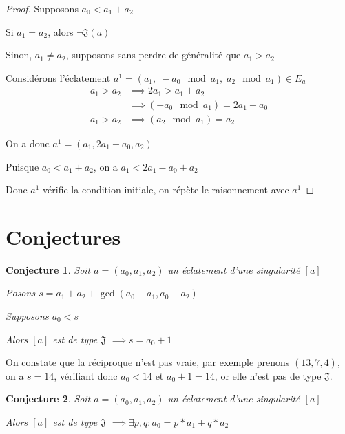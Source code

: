 \documentclass{article}
\newtheorem{conjecture}{Conjecture}
\begin{document}
\begin{proof}
    Supposons $a_0 < a_1 + a_2$

    Si $a_1 = a_2$, alors $\neg \mathfrak{J}(a)$

    Sinon, $a_1 \neq a_2$, supposons sans perdre de généralité que $a_1 > a_2$

    Considérons l'éclatement $a^1 = (a_1,\; -a_0 \mod a_1,\; a_2 \mod a_1) \in E_a$
    \begin{align*}
        a_1 > a_2 & \implies 2a_1 > a_1+a_2               \\
                  & \implies (-a_0 \mod a_1) = 2a_1 - a_0 \\
        a_1 > a_2 & \implies (a_2 \mod a_1) = a_2
    \end{align*}

    On a donc $a^1 = (a_1, 2a_1-a_0, a_2)$

    Puisque $a_0 < a_1 + a_2$, on a $a_1 < 2a_1 - a_0 + a_2$

    Donc $a^1$ vérifie la condition initiale, on répète le raisonnement avec $a^1$
\end{proof}

\section{Conjectures}

\begin{conjecture}
    Soit $a=(a_0, a_1, a_2)$ un éclatement d'une singularité $[a]$

    Posons $s = a_1 + a_2 + \gcd(a_0-a_1, a_0-a_2)$

    Supposons $a_0 < s$

    Alors $[a]$ est de type $\mathfrak{J}$ $\implies s = a_0 + 1$
\end{conjecture}

On constate que la réciproque n'est pas vraie, par exemple prenons $(13, 7, 4)$, on a $s = 14$, vérifiant donc $a_0 < 14$ et $a_0 + 1 = 14$, or elle n'est pas de type $\mathfrak{J}$.

\begin{conjecture}
    Soit $a=(a_0, a_1, a_2)$ un éclatement d'une singularité $[a]$

    Alors $[a]$ est de type $\mathfrak{J}$ $\implies \exists p, q: a_0 = p*a_1 + q*a_2$
\end{conjecture}
\end{document}
